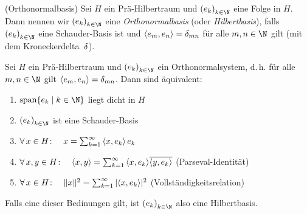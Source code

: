 \nnDef (Orthonormalbasis)
Sei $H$ ein Prä-Hilbertraum und $\kSeq e$ eine Folge in $H$. Dann nennen wir
$\kSeq e$ eine \emph{Orthonormalbasis} (oder \emph{Hilbertbasis}), falls 
$\kSeq e$ eine Schauder-Basis ist und $\left\langle e_m,e_n\right\rangle=\delta_{mn}$ für alle
$m,n\in\N$ gilt (mit dem Kroneckerdelta~$\delta_{}$).

\begin{thSatz} \label{vl14:satz6.17}
    Sei $H$ ein Prä-Hilbertraum und $\kSeq e$ ein Orthonormalsystem, d.\,h.
    für alle $m,n\in\N$ gilt $\left\langle e_m,e_n\right\rangle=\delta_{mn}$. Dann sind äquivalent:
    
\pagebreak[2]
    \begin{enumerate}[(1),labelsep=1em,leftmargin=2cm]
        \item \label{vl14:satz6.17:1}
            $\spann\{  e_k \Mid k\in\N \}$ liegt dicht in $H$
            
        \item \label{vl14:satz6.17:2}
            $\kSeq e$ ist eine Schauder-Basis
            
        \item \label{vl14:satz6.17:3}
            $\forall\,x\in H\colon\quad x= \ksum^\infty \, \SP{x,e_k} \, e_k$
            
        \item \label{vl14:satz6.17:4}
            $\forall\,x,y\in H\colon\quad \SP{x,y} = \ksum^\infty \,
            \SP{x,e_k} \ol{\SP{y,e_k}}$
            \hfill(Parseval-Identität)
            
        \item \label{vl14:satz6.17:5}
            $\forall\,x\in H\colon\quad \lVert x\rVert^2 
            = \sum_{k=1}^\infty \, \lvert\left\langle x,e_k\right\rangle\rvert^2$
            \hfill(Vollständigkeitsrelation)
    \end{enumerate} 
    Falls eine dieser Bedinungen gilt, ist $\kSeq e$ also eine Hilbertbasis.
\end{thSatz}

